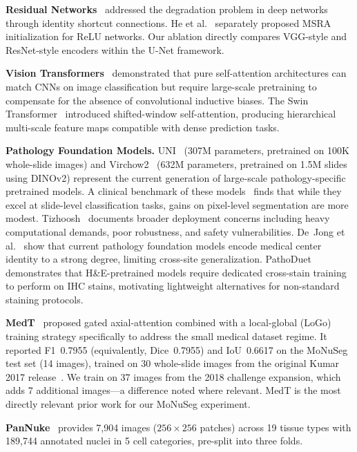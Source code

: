 \documentclass{article}
\begin{document}
\textbf{Residual Networks}~\cite{he2016resnet} addressed the degradation problem in deep networks through identity shortcut connections. He et al.~\cite{he2015msra} separately proposed MSRA initialization for ReLU networks. Our ablation directly compares VGG-style and ResNet-style encoders within the U-Net framework.

\textbf{Vision Transformers}~\cite{dosovitskiy2020vit} demonstrated that pure self-attention architectures can match CNNs on image classification but require large-scale pretraining to compensate for the absence of convolutional inductive biases. The Swin Transformer~\cite{liu2021swin} introduced shifted-window self-attention, producing hierarchical multi-scale feature maps compatible with dense prediction tasks.

\textbf{Pathology Foundation Models.} UNI~\cite{chen2024uni} (307M parameters, pretrained on 100K whole-slide images) and Virchow2~\cite{vorontsov2024virchow} (632M parameters, pretrained on 1.5M slides using DINOv2) represent the current generation of large-scale pathology-specific pretrained models. A clinical benchmark of these models~\cite{campanella2025clinical} finds that while they excel at slide-level classification tasks, gains on pixel-level segmentation are more modest. Tizhoosh~\cite{tizhoosh2025why} documents broader deployment concerns including heavy computational demands, poor robustness, and safety vulnerabilities. De~Jong et al.~\cite{dejong2025current} show that current pathology foundation models encode medical center identity to a strong degree, limiting cross-site generalization. PathoDuet~\cite{hua2024pathoduet} demonstrates that H\&E-pretrained models require dedicated cross-stain training to perform on IHC stains, motivating lightweight alternatives for non-standard staining protocols.

\textbf{MedT}~\cite{valanarasu2021medt} proposed gated axial-attention combined with a local-global (LoGo) training strategy specifically to address the small medical dataset regime. It reported F1~0.7955 (equivalently, Dice~0.7955) and IoU~0.6617 on the MoNuSeg test set (14 images), trained on 30 whole-slide images from the original Kumar 2017 release~\cite{kumar2017monuseg}. We train on 37 images from the 2018 challenge expansion, which adds 7 additional images---a difference noted where relevant. MedT is the most directly relevant prior work for our MoNuSeg experiment.

\textbf{PanNuke}~\cite{gamper2019pannuke, gamper2020pannuke_ext} provides 7,904 images ($256\times256$ patches) across 19 tissue types with 189,744 annotated nuclei in 5 cell categories, pre-split into three folds.
\end{document}
